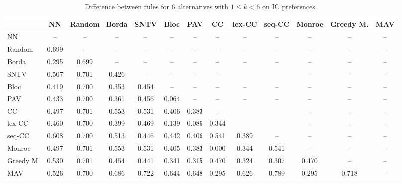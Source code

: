 
\begin{table*}[htbp]
\centering
\begin{tabular}{lcccccccccccc}
\toprule
 & NN & Random & Borda & SNTV & Bloc & PAV & CC & lex-CC & seq-CC & Monroe & Greedy M. & MAV \\
\midrule
NN & -- & -- & -- & -- & -- & -- & -- & -- & -- & -- & -- & -- \\
Random & \cellcolor{blue!69} 0.699 & -- & -- & -- & -- & -- & -- & -- & -- & -- & -- & -- \\
Borda & \cellcolor{blue!29} 0.295 & \cellcolor{blue!69} 0.699 & -- & -- & -- & -- & -- & -- & -- & -- & -- & -- \\
SNTV & \cellcolor{blue!50} 0.507 & \cellcolor{blue!70} 0.701 & \cellcolor{blue!42} 0.426 & -- & -- & -- & -- & -- & -- & -- & -- & -- \\
Bloc & \cellcolor{blue!41} 0.419 & \cellcolor{blue!70} 0.700 & \cellcolor{blue!35} 0.353 & \cellcolor{blue!45} 0.454 & -- & -- & -- & -- & -- & -- & -- & -- \\
PAV & \cellcolor{blue!43} 0.433 & \cellcolor{blue!70} 0.700 & \cellcolor{blue!36} 0.361 & \cellcolor{blue!45} 0.456 & \cellcolor{blue!6} 0.064 & -- & -- & -- & -- & -- & -- & -- \\
CC & \cellcolor{blue!49} 0.497 & \cellcolor{blue!70} 0.701 & \cellcolor{blue!55} 0.553 & \cellcolor{blue!53} 0.531 & \cellcolor{blue!40} 0.406 & \cellcolor{blue!38} 0.383 & -- & -- & -- & -- & -- & -- \\
lex-CC & \cellcolor{blue!46} 0.460 & \cellcolor{blue!70} 0.700 & \cellcolor{blue!39} 0.399 & \cellcolor{blue!46} 0.469 & \cellcolor{blue!13} 0.139 & \cellcolor{blue!8} 0.086 & \cellcolor{blue!34} 0.344 & -- & -- & -- & -- & -- \\
seq-CC & \cellcolor{blue!60} 0.608 & \cellcolor{blue!70} 0.700 & \cellcolor{blue!51} 0.513 & \cellcolor{blue!44} 0.446 & \cellcolor{blue!44} 0.442 & \cellcolor{blue!40} 0.406 & \cellcolor{blue!54} 0.541 & \cellcolor{blue!38} 0.389 & -- & -- & -- & -- \\
Monroe & \cellcolor{blue!49} 0.497 & \cellcolor{blue!70} 0.701 & \cellcolor{blue!55} 0.553 & \cellcolor{blue!53} 0.531 & \cellcolor{blue!40} 0.405 & \cellcolor{blue!38} 0.383 & \cellcolor{blue!0} 0.000 & \cellcolor{blue!34} 0.344 & \cellcolor{blue!54} 0.541 & -- & -- & -- \\
Greedy M. & \cellcolor{blue!53} 0.530 & \cellcolor{blue!70} 0.701 & \cellcolor{blue!45} 0.454 & \cellcolor{blue!44} 0.441 & \cellcolor{blue!34} 0.341 & \cellcolor{blue!31} 0.315 & \cellcolor{blue!47} 0.470 & \cellcolor{blue!32} 0.324 & \cellcolor{blue!30} 0.307 & \cellcolor{blue!47} 0.470 & -- & -- \\
MAV & \cellcolor{blue!52} 0.526 & \cellcolor{blue!70} 0.700 & \cellcolor{blue!68} 0.686 & \cellcolor{blue!72} 0.722 & \cellcolor{blue!64} 0.644 & \cellcolor{blue!64} 0.648 & \cellcolor{blue!29} 0.295 & \cellcolor{blue!62} 0.626 & \cellcolor{blue!78} 0.789 & \cellcolor{blue!29} 0.295 & \cellcolor{blue!71} 0.718 & -- \\
\bottomrule
\end{tabular}

\caption{Difference between rules for 6 alternatives with $1 \leq k < 6$ on IC preferences.}
\label{tab:rule_distance_heatmap-m=[6]-pref_dist=IC}
\end{table*}
    